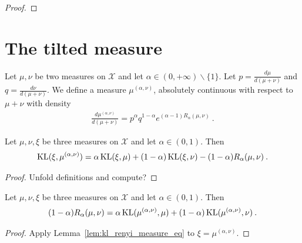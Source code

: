 \begin{proof}
\end{proof}

\section{The tilted measure}

\begin{definition}
  \label{def:renyi_measure}
  \leanok
  Let $\mu, \nu$ be two measures on $\mathcal X$ and let $\alpha \in (0, +\infty) \backslash \{1\}$. Let $p = \frac{d \mu}{d (\mu + \nu)}$ and $q = \frac{d \nu}{d (\mu + \nu)}$. We define a measure $\mu^{(\alpha, \nu)}$, absolutely continuous with respect to $\mu + \nu$ with density
  \begin{align*}
  \frac{d \mu^{(\alpha, \nu)}}{d (\mu + \nu)} = p^\alpha q^{1 - \alpha} e^{(\alpha - 1)R_\alpha(\mu, \nu)} \: .
  \end{align*}
\end{definition}

\begin{lemma}
  \label{lem:kl_renyi_measure_eq}
  Let $\mu, \nu, \xi$ be three measures on $\mathcal X$ and let $\alpha \in (0, 1)$. Then
  \begin{align*}
  \operatorname{KL}(\xi, \mu^{(\alpha, \nu)}) = \alpha \operatorname{KL}(\xi, \mu) + (1 - \alpha)\operatorname{KL}(\xi, \nu) - (1 - \alpha) R_\alpha(\mu, \nu) \: .
  \end{align*}
\end{lemma}

\begin{proof}
Unfold definitions and compute?
\end{proof}

\begin{corollary}
  \label{cor:renyi_eq_add_kl}
  Let $\mu, \nu, \xi$ be three measures on $\mathcal X$ and let $\alpha \in (0, 1)$. Then
  \begin{align*}
  (1 - \alpha) R_\alpha(\mu, \nu) = \alpha \operatorname{KL}(\mu^{(\alpha, \nu)}, \mu) + (1 - \alpha)\operatorname{KL}(\mu^{(\alpha, \nu)}, \nu) \: .
  \end{align*}
\end{corollary}

\begin{proof}
Apply Lemma~\ref{lem:kl_renyi_measure_eq} to $\xi = \mu^{(\alpha, \nu)}$.
\end{proof}

